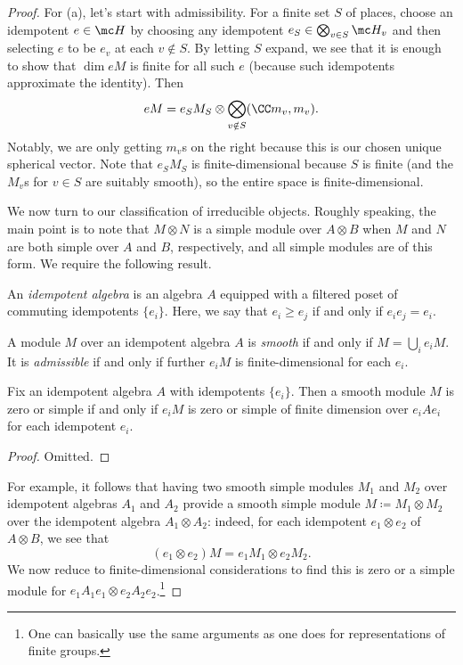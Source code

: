 \documentclass[../notes.tex]{subfiles}
\begin{document}
\begin{proof}
	For (a), let's start with admissibility. For a finite set $S$ of places, choose an idempotent $e\in\mc H$ by choosing any idempotent $e_S\in\bigotimes_{v\in S}\mc H_v$ and then selecting $e$ to be $e_v$ at each $v\notin S$. By letting $S$ expand, we see that it is enough to show that $\dim eM$ is finite for all such $e$ (because such idempotents approximate the identity). Then
	\[eM=e_SM_S\otimes\bigotimes_{v\notin S}(\CC m_v,m_v).\]
	Notably, we are only getting $m_v$s on the right because this is our chosen unique spherical vector. Note that $e_SM_S$ is finite-dimensional because $S$ is finite (and the $M_v$s for $v\in S$ are suitably smooth), so the entire space is finite-dimensional.

	We now turn to our classification of irreducible objects. Roughly speaking, the main point is to note that $M\otimes N$ is a simple module over $A\otimes B$ when $M$ and $N$ are both simple over $A$ and $B$, respectively, and all simple modules are of this form. We require the following result.
	\begin{definition}
		An \textit{idempotent algebra} is an algebra $A$ equipped with a filtered poset of commuting idempotents $\{e_i\}$. Here, we say that $e_i\ge e_j$ if and only if $e_ie_j=e_i$.
	\end{definition}
	\begin{definition}[smooth]
		A module $M$ over an idempotent algebra $A$ is \textit{smooth} if and only if $M=\bigcup_ie_iM$. It is \textit{admissible} if and only if further $e_iM$ is finite-dimensional for each $e_i$.
	\end{definition}
	\begin{lemma}
		Fix an idempotent algebra $A$ with idempotents $\{e_i\}$. Then a smooth module $M$ is zero or simple if and only if $e_iM$ is zero or simple of finite dimension over $e_iAe_i$ for each idempotent $e_i$.
	\end{lemma}
	\begin{proof}
		Omitted.
	\end{proof}
	For example, it follows that having two smooth simple modules $M_1$ and $M_2$ over idempotent algebras $A_1$ and $A_2$ provide a smooth simple module $M\coloneqq M_1\otimes M_2$ over the idempotent algebra $A_1\otimes A_2$: indeed, for each idempotent $e_1\otimes e_2$ of $A\otimes B$, we see that
	\[(e_1\otimes e_2)M=e_1M_1\otimes e_2M_2.\]
	We now reduce to finite-dimensional considerations to find this is zero or a simple module for $e_1A_1e_1\otimes e_2A_2e_2$.\footnote{One can basically use the same arguments as one does for representations of finite groups.}


\end{proof}
\end{document}
